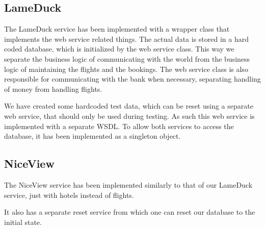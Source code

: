\subsection{LameDuck}
The LameDuck service has been implemented with a wrapper class that implements the web service related things. The actual data is stored in a hard coded database, which is initialized by the web service class. This way we separate the business logic of communicating with the world from the business logic of maintaining the flights and the bookings. The web service class is also responsible for communicating with the bank when necessary, separating handling of money from handling flights.

We have created some hardcoded test data, which can be reset using a separate web service, that should only be used during testing. As such this web service is implemented with a separate WSDL. To allow both services to access the database, it has been implemented as a singleton object.


\subsection{NiceView}
The NiceView service has been implemented similarly to that of our LameDuck service, just with hotels instead of flights.

It also has a separate reset service from which one can reset our database to the initial state.


